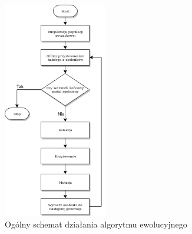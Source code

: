 \begin{figure}[h]
    \centering        
    \includegraphics[width=0.4\textwidth]{img/alg_ewo_szkic.png}
    \caption{Ogólny schemat działania algorytmu ewolucyjnego}
    \label{alg_ewo_img}
\end{figure}

